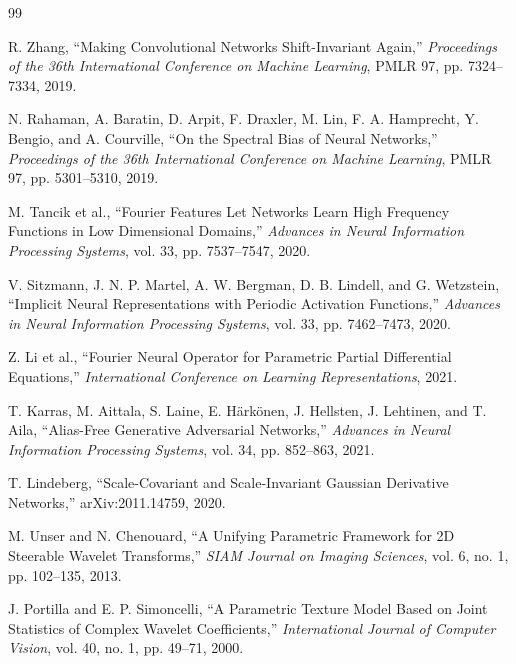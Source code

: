 \documentclass[12pt,openany,oneside]{book}
\begin{document}
\begin{thebibliography}{99}
\begin{LTR}
R. Zhang,
``Making Convolutional Networks Shift-Invariant Again,''
\emph{Proceedings of the 36th International Conference on Machine Learning},
PMLR 97, pp. 7324--7334, 2019.

N. Rahaman, A. Baratin, D. Arpit, F. Draxler, M. Lin, F. A. Hamprecht,
Y. Bengio, and A. Courville,
``On the Spectral Bias of Neural Networks,''
\emph{Proceedings of the 36th International Conference on Machine Learning},
PMLR 97, pp. 5301--5310, 2019.

M. Tancik et al.,
``Fourier Features Let Networks Learn High Frequency Functions in Low Dimensional Domains,''
\emph{Advances in Neural Information Processing Systems}, vol. 33, pp. 7537--7547, 2020.

V. Sitzmann, J. N. P. Martel, A. W. Bergman, D. B. Lindell, and G. Wetzstein,
``Implicit Neural Representations with Periodic Activation Functions,''
\emph{Advances in Neural Information Processing Systems}, vol. 33, pp. 7462--7473, 2020.

Z. Li et al.,
``Fourier Neural Operator for Parametric Partial Differential Equations,''
\emph{International Conference on Learning Representations}, 2021.

T. Karras, M. Aittala, S. Laine, E. H\"ark\"onen, J. Hellsten, J. Lehtinen, and T. Aila,
``Alias-Free Generative Adversarial Networks,''
\emph{Advances in Neural Information Processing Systems}, vol. 34, pp. 852--863, 2021.

T. Lindeberg,
``Scale-Covariant and Scale-Invariant Gaussian Derivative Networks,''
arXiv:2011.14759, 2020.

M. Unser and N. Chenouard,
``A Unifying Parametric Framework for 2D Steerable Wavelet Transforms,''
\emph{SIAM Journal on Imaging Sciences}, vol. 6, no. 1, pp. 102--135, 2013.

J. Portilla and E. P. Simoncelli,
``A Parametric Texture Model Based on Joint Statistics of Complex Wavelet Coefficients,''
\emph{International Journal of Computer Vision}, vol. 40, no. 1, pp. 49--71, 2000.

\end{LTR}
\end{thebibliography}
\end{document}
